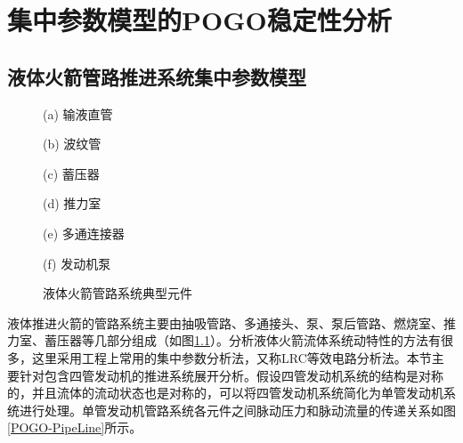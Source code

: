 
\chapter{集中参数模型的POGO稳定性分析}

\section{液体火箭管路推进系统集中参数模型}
\label{sec:Lumped-Feedline-Model}
\begin{figure}[!htb]
  \centering
  \begin{minipage}[b]{0.3\textwidth}
    \centering
    \caption*{(a) 输液直管}
  \end{minipage}
  \centering
  \begin{minipage}[b]{0.3\textwidth}
    \centering
    \caption*{(b) 波纹管}
  \end{minipage}
  \centering
  \begin{minipage}[b]{0.3\textwidth}
    \centering
    \caption*{(c) 蓄压器}
  \end{minipage}
  \centering
  \begin{minipage}[b]{0.3\textwidth}
    \centering
    \caption*{(d) 推力室}
  \end{minipage}
  \centering
  \begin{minipage}[b]{0.3\textwidth}
    \centering
    \caption*{(e) 多通连接器}
  \end{minipage}
  \centering
  \begin{minipage}[b]{0.3\textwidth}
    \centering
    \caption*{(f) 发动机泵}
  \end{minipage}
  \caption{液体火箭管路系统典型元件}
  \label{FeedLine-TypicalElement}
\end{figure}

液体推进火箭的管路系统主要由抽吸管路、多通接头、泵、泵后管路、燃烧室、推力室、蓄压器等几部分组成（如图\ref{FeedLine-TypicalElement}）。分析液体火箭流体系统动特性的方法有很多，这里采用工程上常用的集中参数分析法，又称LRC等效电路分析法\cite{Dimaggio:1972, Vaage:1972, YangMing:2010}。本节主要针对包含四管发动机的推进系统展开分析。假设四管发动机系统的结构是对称的，并且流体的流动状态也是对称的，可以将四管发动机系统简化为单管发动机系统进行处理。单管发动机管路系统各元件之间脉动压力和脉动流量的传递关系如图\ref{POGO-PipeLine}所示。

